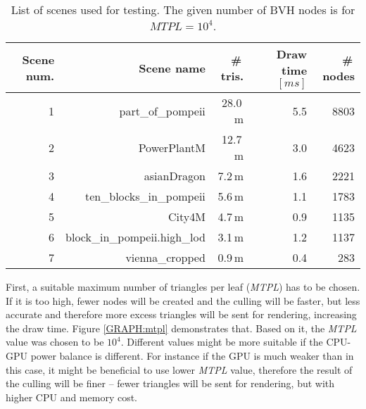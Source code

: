 \documentclass[report,11pt]{elsarticle}
\begin{document}
\begin{table*}[t]
\begin{center}
\begin{tabular}{| r | r | r | r | r |}
	\hline
	Scene num. 	& Scene name & \#\,tris. & Draw time $[ms]$ & \#\,nodes \\
	\hline
	\hline
	1						& part\_of\_pompeii 						& 28.0\,m	& 5.5 & 8803 \\
	\hline
	2						& PowerPlantM										& 12.7\,m & 3.0 & 4623 \\
	\hline
	3 					& asianDragon										& 7.2\,m 	& 1.6 & 2221 \\
	\hline
	4        		& ten\_blocks\_in\_pompeii  		& 5.6\,m 	& 1.1 & 1783 \\
	\hline
	5						& City4M												& 4.7\,m	& 0.9 & 1135 \\
	\hline
	6						& block\_in\_pompeii.high\_lod 	& 3.1\,m 	& 1.2 & 1137 \\
	\hline
	7						& vienna\_cropped								& 0.9\,m	& 0.4 & 283 \\
	\hline
\end{tabular}
\end{center}
	\caption{List of scenes used for testing. The given number of BVH nodes is for $MTPL=10^{4}$.}
	\label{TAB:scenes}
\end{table*}

First, a suitable maximum number of triangles per leaf (\emph{MTPL}) has to be chosen. If it is too high, fewer nodes will be created and the culling will be faster, but less accurate and therefore more excess triangles will be sent for rendering, increasing the draw time. Figure \ref{GRAPH:mtpl} demonstrates that. Based on it, the \emph{MTPL} value was chosen to be $10^{4}$. Different values might be more suitable if the CPU-GPU power balance is different. For instance if the GPU is much weaker than in this case, it might be beneficial to use lower \emph{MTPL} value, therefore the result of the culling will be finer -- fewer triangles will be sent for rendering, but with higher CPU and memory cost.
\end{document}
